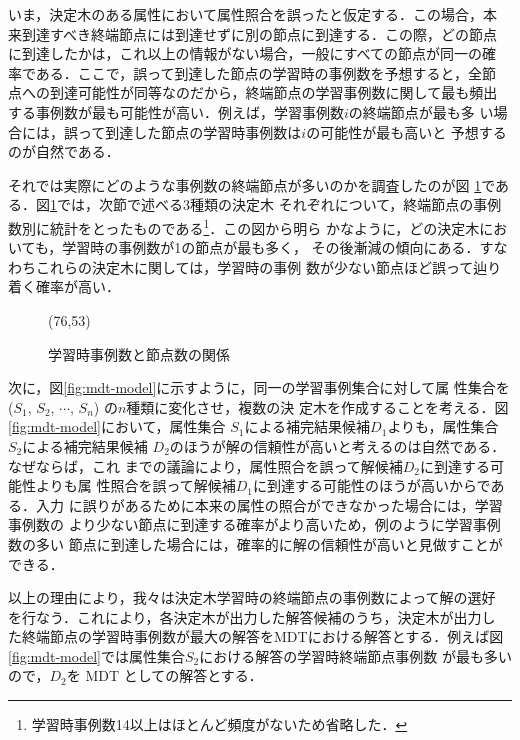 いま，決定木のある属性において属性照合を誤ったと仮定する．この場合，本
来到達すべき終端節点には到達せずに別の節点に到達する．この際，どの節点
に到達したかは，これ以上の情報がない場合，一般にすべての節点が同一の確
率である．ここで，誤って到達した節点の学習時の事例数を予想すると，全節
点への到達可能性が同等なのだから，終端節点の学習事例数に関して最も頻出
する事例数が最も可能性が高い．例えば，学習事例数$i$の終端節点が最も多
い場合には，誤って到達した節点の学習時事例数は$i$の可能性が最も高いと
予想するのが自然である．

それでは実際にどのような事例数の終端節点が多いのかを調査したのが図
\ref{fig:freq}である．図\ref{fig:freq}では，次節で述べる3種類の決定木
それぞれについて，終端節点の事例数別に統計をとったものである\footnote
{学習時事例数14以上はほとんど頻度がないため省略した．}．この図から明ら
かなように，どの決定木においても，学習時の事例数が1の節点が最も多く，
その後漸減の傾向にある．すなわちこれらの決定木に関しては，学習時の事例
数が少ない節点ほど誤って辿り着く確率が高い．

\begin{figure}
\begin{center}
    \begin{epsf}
    \end{epsf}
    \begin{draft}
    \atari(76,53)
    \end{draft}
\caption{学習時事例数と節点数の関係}
\label{fig:freq}
\end{center}
\end{figure}

次に，図\ref{fig:mdt-model}に示すように，同一の学習事例集合に対して属
性集合を($S_1$, $S_2$, $\cdots$, $S_n$) の$n$種類に変化させ，複数の決
定木を作成することを考える．図\ref{fig:mdt-model}において，属性集合
$S_1$による補完結果候補$D_1$よりも，属性集合$S_2$による補完結果候補
$D_2$のほうが解の信頼性が高いと考えるのは自然である．なぜならば，これ
までの議論により，属性照合を誤って解候補$D_2$に到達する可能性よりも属
性照合を誤って解候補$D_1$に到達する可能性のほうが高いからである．入力
に誤りがあるために本来の属性の照合ができなかった場合には，学習事例数の
より少ない節点に到達する確率がより高いため，例のように学習事例数の多い
節点に到達した場合には，確率的に解の信頼性が高いと見做すことができる．

以上の理由により，我々は決定木学習時の終端節点の事例数によって解の選好
を行なう．これにより，各決定木が出力した解答候補のうち，決定木が出力し
た終端節点の学習時事例数が最大の解答をMDTにおける解答とする．例えば図
\ref{fig:mdt-model}では属性集合$S_2$における解答の学習時終端節点事例数
が最も多いので，$D_2$を MDT としての解答とする．


